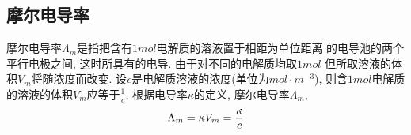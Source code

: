 \documentclass[a4paper]{article}
\begin{document}
\subsection{摩尔电导率}
摩尔电导率$\Lambda_{m}$是指把含有$1mol$电解质的溶液置于相距为单位距离
的电导池的两个平行电极之间, 这时所具有的电导. 由于对不同的电解质均取$1mol$
但所取溶液的体积$V_{m}$将随浓度而改变. 设$c$是电解质溶液的浓度(单位为$mol\cdot m^{-3}$), 
则含$1mol$电解质的溶液的体积$V_{m}$应等于$\frac{1}{c}$, 根据电导率$\kappa$的定义, 
摩尔电导率$\Lambda_{m}$,
\begin{equation}
	\Lambda_{m} = \kappa V_{m} = \frac{\kappa}{c}\\
\end{equation}
\end{document}
